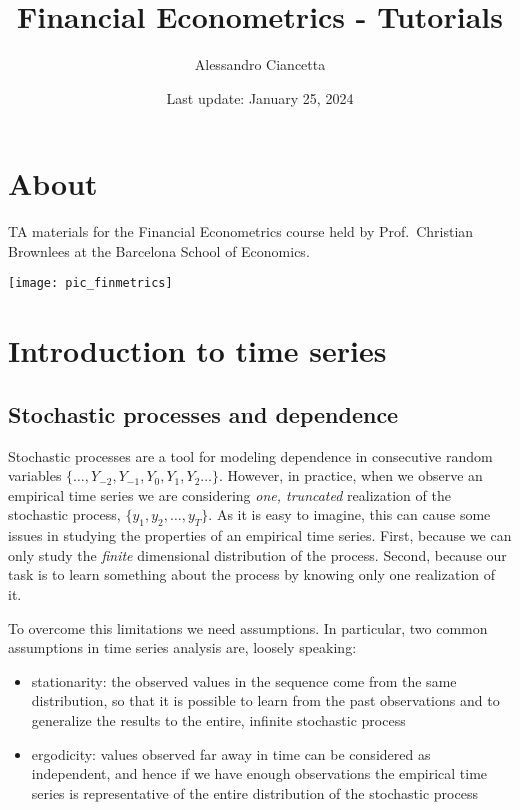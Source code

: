 \documentclass[
]{book}
\title{Financial Econometrics - Tutorials}
\author{Alessandro Ciancetta}
\date{Last update: January 25, 2024}
\begin{document}
\maketitle

{
\setcounter{tocdepth}{1}
\tableofcontents
}
\hypertarget{about}{%
\chapter*{About}\label{about}}

TA materials for the Financial Econometrics course held by Prof.~Christian Brownlees at the Barcelona School of Economics.

\begin{center}\texttt{[image: pic\_finmetrics]} \end{center}

\hypertarget{session01}{%
\chapter{Introduction to time series}\label{session01}}

\hypertarget{stochastic-processes-and-dependence}{%
\section{Stochastic processes and dependence}\label{stochastic-processes-and-dependence}}

Stochastic processes are a tool for modeling dependence in consecutive random variables \(\{\dots, Y_{-2}, Y_{-1}, Y_{0}, Y_{1}, Y_{2} \dots\}\). However, in practice, when we observe an empirical time series we are considering \emph{one, truncated} realization of the stochastic process, \(\{y_1, y_2, \dots, y_T\}\). As it is easy to imagine, this can cause some issues in studying the properties of an empirical time series. First, because we can only study the \emph{finite} dimensional distribution of the process. Second, because our task is to learn something about the process by knowing only one realization of it.

To overcome this limitations we need assumptions. In particular, two common assumptions in time series analysis are, loosely speaking:

\begin{itemize}
\item
  stationarity: the observed values in the sequence come from the same distribution, so that it is possible to learn from the past observations and to generalize the results to the entire, infinite stochastic process
\item
  ergodicity: values observed far away in time can be considered as independent, and hence if we have enough observations the empirical time series is representative of the entire distribution of the stochastic process
\end{itemize}
\end{document}
